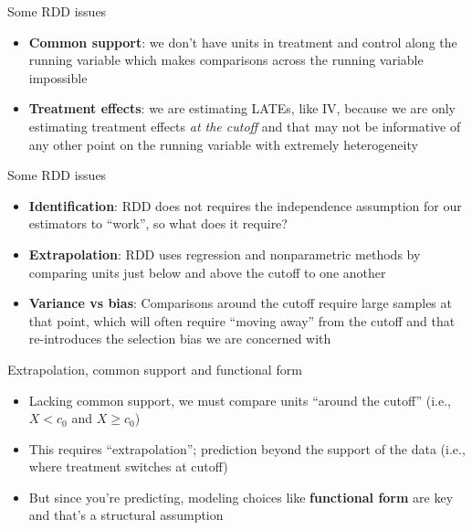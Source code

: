 \documentclass{beamer}
\begin{document}
\begin{frame}{Some RDD issues}

\begin{itemize}
\item \textbf{Common support}: we don't have units in treatment and control along the running variable which makes comparisons across the running variable impossible
\item \textbf{Treatment effects}: we are estimating LATEs, like IV, because we are only estimating treatment effects \emph{at the cutoff} and that may not be informative of any other point on the running variable with extremely heterogeneity
\end{itemize}

\end{frame}

\begin{frame}{Some RDD issues}

\begin{itemize}
\item \textbf{Identification}: RDD does not requires the independence assumption for our estimators to ``work'', so what does it require?
\item \textbf{Extrapolation}: RDD uses regression and nonparametric methods by comparing units just below and above the cutoff to one another
\item \textbf{Variance vs bias}: Comparisons around the cutoff require large samples at that point, which will often require ``moving away'' from the cutoff and that re-introduces the selection bias we are concerned with
\end{itemize}

\end{frame}




\begin{frame}{Extrapolation, common support and functional form}

\begin{itemize}
\item Lacking common support, we must compare units ``around the cutoff'' (i.e., $X<c_0$ and $X\geq c_0$)
\item This requires ``extrapolation''; prediction beyond the support of the data (i.e., where treatment switches at cutoff)
\item But since you're predicting, modeling choices like \textbf{functional form} are key and that's a structural assumption
\end{itemize}

\end{frame}
\end{document}
